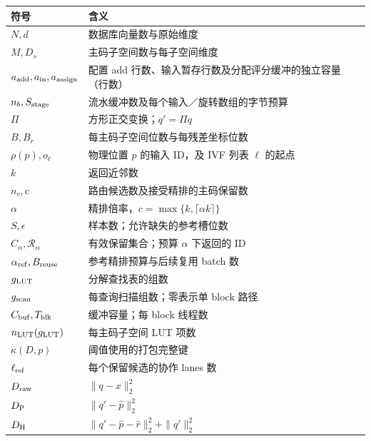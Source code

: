 \begingroup\small{}
\begin{longtable}{@{}>{\raggedright\arraybackslash}p{.25\linewidth}>{\raggedright\arraybackslash}p{.70\linewidth}@{}}
\toprule
符号 & 含义 \\
\midrule
$N,d$ & 数据库向量数与原始维度 \\
$M,D_s$ & 主码子空间数与每子空间维度 \\
$a_{\rm add},a_{\rm in},a_{\rm assign}$ & 配置 add 行数、输入暂存行数及分配评分缓冲的独立容量（行数） \\
$n_b,S_{\rm stage}$ & 流水缓冲数及每个输入／旋转数组的字节预算 \\
$\Pi$ & 方形正交变换；$q'=\Pi q$ \\
$B,B_r$ & 每主码子空间位数与每残差坐标位数 \\
$\rho(p),o_\ell$ & 物理位置 $p$ 的输入 ID，及 IVF 列表 $\ell$ 的起点 \\
$k$ & 返回近邻数 \\
$n_c,c$ & 路由候选数及接受精排的主码保留数 \\
$\alpha$ & 精排倍率，$c=\max\{k,\lceil\alpha k\rceil\}$ \\
$S,\epsilon$ & 样本数；允许缺失的参考槽位数 \\
$C_\alpha,\mathcal R_\alpha$ & 有效保留集合；预算 $\alpha$ 下返回的 ID \\
$\alpha_{\rm ref},B_{\rm reuse}$ & 参考精排预算与后续复用 batch 数 \\
$g_{\mathrm{LUT}}$ & 分解查找表的组数 \\
$g_{\mathrm{scan}}$ & 每查询扫描组数；零表示单 block 路径 \\
$C_{\rm buf},T_{\rm blk}$ & 缓冲容量；每 block 线程数 \\
$n_{\rm LUT}(g_{\mathrm{LUT}})$ & 每主码子空间 LUT 项数 \\
$\kappa(D,p)$ & 阈值使用的打包完整键 \\
$\ell_{\mathrm{ref}}$ & 每个保留候选的协作 lanes 数 \\
$D_{\mathrm{raw}}$ & $\|q-x\|_2^2$ \\
$D_{\mathrm{P}}$ & $\|q'-\widehat p\|_2^2$ \\
$D_{\mathrm{H}}$ & $\|q'-\widehat p-\widehat r\|_2^2+\|q'\|_2^2$ \\
\bottomrule
\end{longtable}

